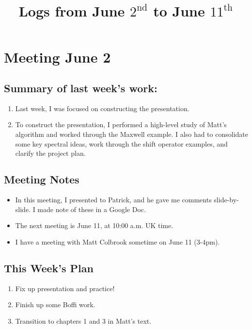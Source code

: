 \documentclass[12pt,a4paper]{article}
\title{Logs from June $2^{\text{nd}}$ to June $11^{\text{th}}$}
\author{}
\date{}
\begin{document}
\maketitle

\section{Meeting June 2}

\subsection{Summary of last week's work:}




\begin{enumerate}
    \item Last week, I was focused on constructing the presentation.
    \item To construct the presentation, I performed a high-level study of Matt's algorithm and worked through the Maxwell example. I also had to consolidate some key spectral ideas, work through the shift operator examples, and clarify the project plan.
\end{enumerate}



\subsection{Meeting Notes}

\begin{itemize}
    \item In this meeting, I presented to Patrick, and he gave me comments slide-by-slide. I made note of these in a Google Doc.

    \item The next meeting is June 11, at 10:00 a.m. UK time.

    \item I have a meeting with Matt Colbrook sometime on June 11 (3-4pm).
    
\end{itemize}


\subsection{This Week's Plan}

\begin{enumerate}

    \item Fix up presentation and practice!
    \item Finish up some Boffi work.
    \item Transition to chapters 1 and 3 in Matt's text. 
    

\end{enumerate}
\end{document}
